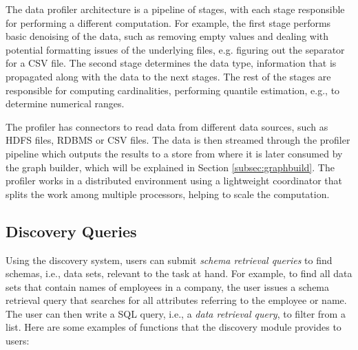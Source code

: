 The data profiler architecture is a pipeline of stages, with each stage
responsible for performing a different computation. For example, the first stage
performs basic denoising of the data, such as removing empty values and dealing
with potential formatting issues of the underlying files, e.g. figuring out the
separator for a CSV file.  The second stage determines the data type,
information that is propagated along with the data to the next stages. The rest
of the stages are responsible for computing cardinalities, performing quantile
estimation, e.g., to determine numerical ranges.

The profiler has connectors to read data from different data sources, such as
HDFS files, RDBMS or CSV files. The data is then streamed through the profiler
pipeline which outputs the results
to a store from where it is later consumed by the graph builder, which will be
explained in Section \ref{subsec:graphbuild}.
The profiler works in a distributed environment using a lightweight coordinator
that splits the work among multiple processors, helping to scale the
computation.



\subsection{Discovery Queries}
\label{subsec:api}

Using the discovery system, users can submit \emph{schema retrieval queries}
to find schemas, i.e., data sets, relevant to the task at hand. 
For example, to find all data sets that contain names of
employees in a company, the user issues a schema retrieval query that searches for all
attributes referring to the employee or name.
The user can then write a SQL query, i.e., a \emph{data retrieval query}, to filter from a list. 
Here are some examples of functions that the discovery module provides to users:

